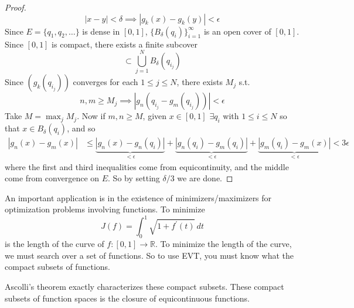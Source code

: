 \begin{proof}
    \begin{equation}
      |x - y| < \delta \implies |g_k (x) - g_k (y)| < \epsilon
    \end{equation} 
    Since $E = \{q_1, q_2, \ldots \}$ is dense in $[0, 1]$, $\{B_\delta (q_i) \}_{i=1}^\infty$ is an open cover of $[0, 1]$. Since $[0, 1]$ is compact, there exists a finite subcover 
    \begin{equation}
      [0, 1] \subset \bigcup_{j=1}^N B_{\delta} (q_{i_j})
    \end{equation}
    Since $(g_k (q_{i_j}))$ converges for each $1 \leq j \leq N$, there exists $M_j$ s.t. 
    \begin{equation}
      n, m \geq M_j \implies |g_n (q_{i_j} - g_m (q_{i_j}))| < \epsilon
    \end{equation}
    Take $M = \max_j M_j$. Now if $m, n \geq M$, given $x \in [0, 1]$ $\exists q_i$ with $1 \leq i \leq N$ so that $x \in B_\delta (q_i)$, and so 
    \begin{align}
      |g_n (x) - g_m (x)| & \leq \underbrace{| g_n (x) - g_n (q_i)|}_{< \epsilon} + \underbrace{| g_n (q_i) - g_m (q_i)|}_{< \epsilon} + \underbrace{|g_m (q_i) - g_m (x)|}_{< \epsilon} < 3\epsilon
    \end{align}
    where the first and third inequalities come from equicontinuity, and the middle come from convergence on $E$. So by setting $\delta/3$ we are done. 
  \end{proof}

  \begin{example}
    \label{ex:important-application-existence-minimizers}
    An important application is in the existence of minimizers/maximizers for optimization problems involving functions. To minimize 
    \begin{equation}
      J(f) = \int_0^1 \sqrt{1 + f^\prime (t)} \,dt 
    \end{equation}
    is the length of the curve of $f: [0, 1] \to \mathbb{R}$. To minimize the length of the curve, we must search over a set of functions. So to use EVT, you must know what the compact subsets of functions. 
  \end{example}

  Ascolli's theorem exactly characterizes these compact subsets. These compact subsets of function spaces is the closure of equicontinuous functions. 


